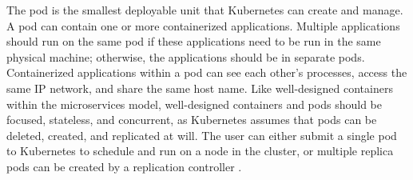 The pod is the smallest deployable unit that Kubernetes can create and
manage. A pod can contain one or more
containerized applications. Multiple applications should run on the same pod
if these applications need to be run in the same
physical machine; otherwise, the applications should be in separate pods.
Containerized applications within a pod can see each other's processes,
access the same IP network, and share the same host name. Like well-designed
containers within the microservices model, well-designed containers and pods should be
focused, stateless, and concurrent, as Kubernetes assumes that pods can be deleted,
created, and replicated at will. The user can either submit a
single pod to Kubernetes to schedule and run on a node in the cluster, or
multiple replica pods
can be created by a replication controller \cite{k8s-pods}.
